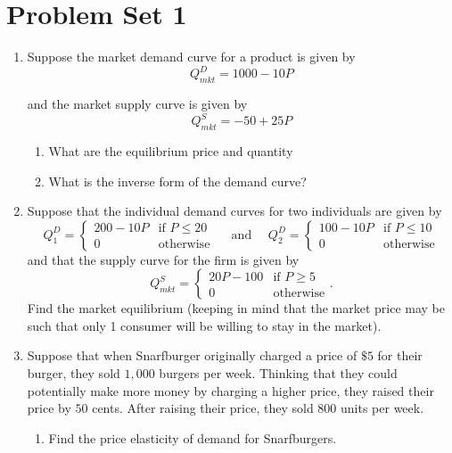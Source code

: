 \documentclass[11pt]{article}
\begin{document}
  
\section*{Problem Set 1}

\begin{enumerate}

	\item Suppose the market demand curve for a product is given by 
	$$
		Q^D_{mkt} = 1000 - 10P
	$$
	
	and the market supply curve is given by
	$$
		Q^S_{mkt} = -50 + 25P
	$$
	\begin{enumerate}
    \item What are the equilibrium price and quantity
    
    \item What is the inverse form of the demand curve?
  \end{enumerate}
  
  \newpage 
  \item Suppose that the individual demand curves for two individuals are given by
  $$
    Q^D_1 = \begin{cases} 
      200 - 10P & \text{if } P \leq 20 \\ 
      0         & \text{otherwise} 
    \end{cases}
    \quad\text{ and }\quad
    Q^D_2 = \begin{cases} 
      100 - 10P & \text{if } P \leq 10 \\ 
      0         & \text{otherwise} 
    \end{cases}
  $$
  and that the supply curve for the firm is given by
  $$
    Q^S_{mkt} = \begin{cases} 
      20P - 100 & \text{if } P \geq 5 \\ 
      0         & \text{otherwise} 
    \end{cases}.
  $$
  Find the market equilibrium (keeping in mind that the market price may be such that only 1 consumer will be willing to stay in the market).

  \newpage 
  \item Suppose that when Snarfburger originally charged a price of $\$5$ for their burger, they sold $1,000$ burgers per week. Thinking that they could potentially make more money by charging a higher price, they raised their price by $50$ cents. After raising their price, they sold $800$
  units per week. 
  
  \begin{enumerate}
    \item Find the price elasticity of demand for Snarfburgers. 
    

\end{enumerate}
\end{enumerate}
\end{document}
